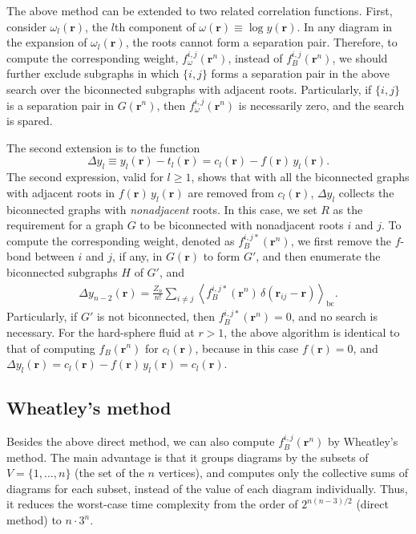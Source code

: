 \documentclass[aip,jcp,preprint,superscriptaddress,showpacs,preprintnumbers,amsmath,amssymb]{revtex4-1}
\numberwithin{equation}{section}
\newcommand{\vct}[1]{\mathbf{#1}}
\providecommand{\vr}{} %
\renewcommand{\vr}{\vct{r}}
\begin{document}
The above method can be extended to
two related correlation functions.
%
First,
consider $\omega_l(\vr)$,
the $l$th component of $\omega(\vr) \equiv \log y(\vr)$.
%
%
In any diagram in the expansion of $\omega_l(\vr)$,
the roots cannot form a separation pair.
%
Therefore, to compute the corresponding weight,
$f_\omega^{i,j}(\vr^n)$,
instead of $f_B^{i,j}(\vr^n)$,
we should further exclude subgraphs in which $\{i,j\}$
forms a separation pair in the above search over
the biconnected subgraphs with adjacent roots.
%
Particularly,
if $\{i, j\}$ is a separation pair in $G(\vr^n)$,
then $f_\omega^{i,j}(\vr^n)$ is necessarily zero,
and the search is spared.



The second extension is to the function
\[
\Delta y_l
\equiv
y_l(\vr) - t_l(\vr)
= c_l(\vr) - f(\vr) \, y_l(\vr).
\]
The second expression, valid for $l \ge 1$,
shows that with all the biconnected graphs
with adjacent roots in $f(\vr) \, y_l(\vr)$
are removed from $c_l(\vr)$,
$\Delta y_l$ collects the biconnected graphs
with \emph{nonadjacent} roots.
%
In this case,
we set $R$ as the requirement for a graph $G$
to be biconnected with nonadjacent roots $i$ and $j$.
%
To compute the corresponding weight,
denoted as $f_B^{i,j*}(\vr^n)$,
we first remove the $f$-bond between $i$ and $j$,
if any, in $G(\vr)$ to form $G'$,
and then enumerate the biconnected subgraphs $H$ of $G'$,
and
%
%
%
\begin{align*}
\Delta y_{n-2}(\vr)
=
\frac{Z_n}{n!}
\sum_{i \ne j}
  \left\langle
    f_B^{i, j*}(\vr^n) \, \delta(\vr_{ij} - \vr)
  \right\rangle_\mathrm{bc}.
\end{align*}
%
%
%
Particularly,
if $G'$ is not biconnected,
then $f_B^{i,j*}(\vr^n) = 0$,
and no search is necessary.
%
For the hard-sphere fluid at $r > 1$,
the above algorithm is identical to that of
computing $f_B(\vr^n)$ for $c_l(\vr)$,
because in this case
$f(\vr) = 0$,
and
$\Delta y_l(\vr) = c_l(\vr) - f(\vr) \, y_l(\vr) = c_l(\vr)$.





\subsection{Wheatley's method}





Besides the above direct method,
we can also compute $f_B^{i,j}(\vr^n)$
by Wheatley's method\cite{wheatley2013}.
%
The main advantage is that
it groups diagrams
by the subsets of $V = \{1, \dots, n\}$
(the set of the $n$ vertices),
and computes only the collective sums of diagrams
for each subset,
instead of the value of each diagram individually.
%
Thus, it reduces the worst-case time complexity
from the order of $2^{n(n-3)/2}$ (direct method)
to $n\cdot3^n$.
\end{document}
